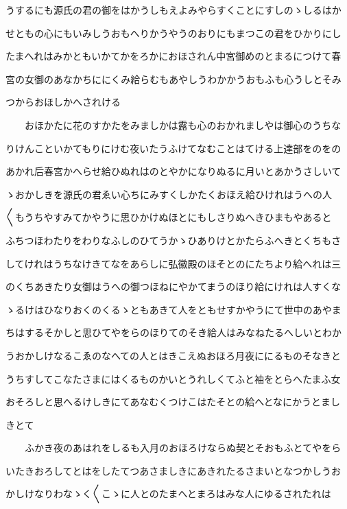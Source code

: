 \documentclass[a4paper,11pt,landscape]{ltjtarticle}
\begin{document}
\par\medskip
うするにも源氏の君の御をはかうしもえよみやらすくことにすしのゝしるはか
\par\medskip
せともの心にもいみしうおもへりかうやうのおりにもまつこの君をひかりにし
\par\medskip
たまへれはみかともいかてかをろかにおほされん中宮御めのとまるにつけて春
\par\medskip
宮の女御のあなかちににくみ給らむもあやしうわかかうおもふも心うしとそみ
\par\medskip
つからおほしかへされける
\par\medskip
　　おほかたに花のすかたをみましかは露も心のおかれましやは御心のうちな
\par\medskip
りけんこといかてもりにけむ夜いたうふけてなむことはてける上達部をのをの
\par\medskip
あかれ后春宮かへらせ給ひぬれはのとやかになりぬるに月いとあかうさしいて
\par\medskip
ゝおかしきを源氏の君ゑい心ちにみすくしかたくおほえ給ひけれはうへの人
\par\medskip
〱もうちやすみてかやうに思ひかけぬほとにもしさりぬへきひまもやあると
\par\medskip
ふちつほわたりをわりなふしのひてうかゝひありけとかたらふへきとくちもさ
\par\medskip
してけれはうちなけきてなをあらしに弘徽殿のほそとのにたちより給へれは三
\par\medskip
のくちあきたり女御はうへの御つほねにやかてまうのほり給にけれは人すくな
\par\medskip
ゝるけはひなりおくのくるゝともあきて人をともせすかやうにて世中のあやま
\par\medskip
ちはするそかしと思ひてやをらのほりてのそき給人はみなねたるへしいとわか
\par\medskip
うおかしけなるこゑのなへての人とはきこえぬおほろ月夜ににるものそなきと
\par\medskip
うちすしてこなたさまにはくるものかいとうれしくてふと袖をとらへたまふ女
\par\medskip
おそろしと思へるけしきにてあなむくつけこはたそとの給へとなにかうとまし
\par\medskip
きとて
\par\medskip
　　ふかき夜のあはれをしるも入月のおほろけならぬ契とそおもふとてやをら
\par\medskip
いたきおろしてとはをしたてつあさましきにあきれたるさまいとなつかしうお
\par\medskip
かしけなりわなゝく〱こゝに人とのたまへとまろはみな人にゆるされたれは
\end{document}
